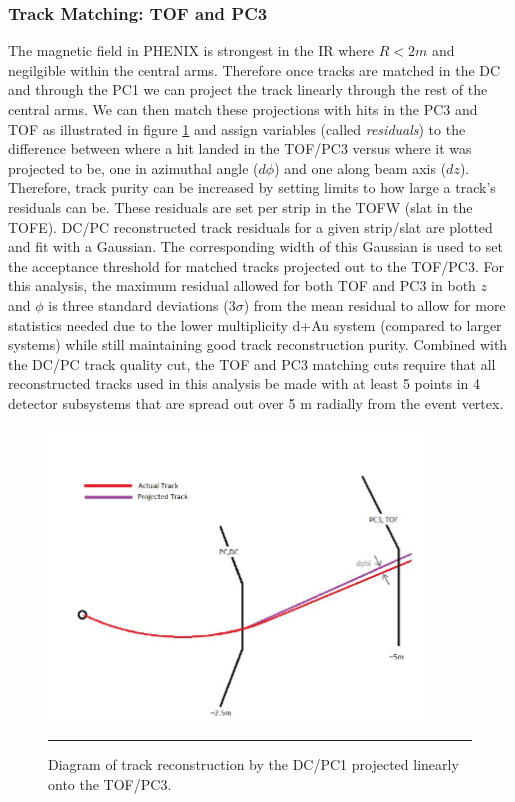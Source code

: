 \subsubsection{Track Matching: TOF and PC3}
The magnetic field in PHENIX is strongest in the IR where $R<2 m$ and negilgible within the central arms\citep{rolnickthesis}. Therefore once tracks are matched in the DC and through the PC1 we can project the track linearly through the rest of the central arms. We can then match these projections with hits in the PC3 and TOF as illustrated in figure \ref{fig:pc3tofmatching} and assign variables (called \textit{residuals}) to the difference between where a hit landed in the TOF/PC3 versus where it was projected to be, one in azimuthal angle ($d\phi$) and one along beam axis ($dz$). Therefore, track purity can be increased by setting limits to how large a track's residuals can be. These residuals are set per strip in the TOFW (slat in the TOFE). DC/PC reconstructed track residuals for a given strip/slat are plotted and fit with a Gaussian. The corresponding width of this Gaussian is used to set the acceptance threshold for matched tracks projected out to the TOF/PC3. For this analysis, the maximum residual allowed for both TOF and PC3 in both $z$ and $\phi$ is three standard deviations ($3\sigma$) from the mean residual to allow for more statistics needed due to the lower multiplicity d+Au system (compared to larger systems) while still maintaining good track reconstruction purity. Combined with the DC/PC track quality cut, the TOF and PC3 matching cuts require that all reconstructed tracks used in this analysis be made with at least 5 points in 4 detector subsystems that are spread out over 5 m radially from the event vertex.
\begin{figure}[htbp!]
  \centering
    \includegraphics[width=0.9\textwidth]{Figures/pc3tofmatching.JPG}
    \rule{35em}{0.5pt}
  \caption[Diagram of track reconstruction by the DC/PC1 projected linearly onto the TOF/PC3]{Diagram of track reconstruction by the DC/PC1 projected linearly onto the TOF/PC3. \citep{schaeferthesis}}
  \label{fig:pc3tofmatching}
\end{figure}

